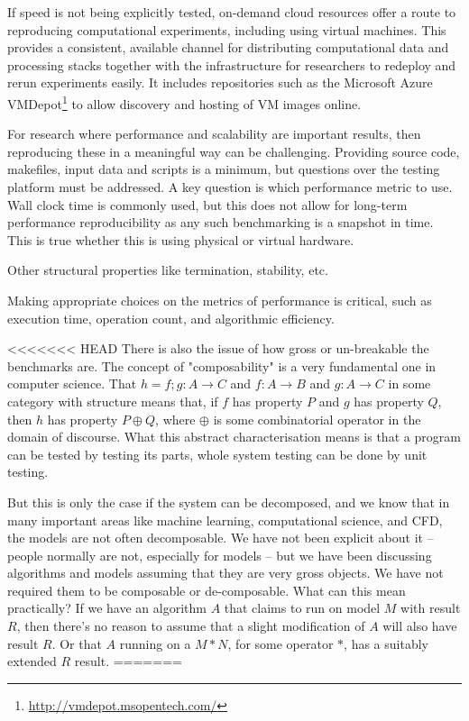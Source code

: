 \documentclass[conference]{IEEEtran}
\begin{document}
If speed is not being explicitly tested, on-demand cloud resources
offer a route to reproducing computational experiments, including
using virtual machines. This provides a consistent, available channel
for distributing computational data and processing stacks together
with the infrastructure for researchers to redeploy and rerun
experiments easily. It includes repositories such as the Microsoft
Azure VMDepot\footnote{\url{http://vmdepot.msopentech.com/}} to allow
discovery and hosting of VM images online.

For research  where performance and scalability are important results, then 
reproducing these in a meaningful way can be challenging. Providing source
code, makefiles, input data and scripts is a minimum, but questions over the
testing platform must be addressed. A key question is which performance 
metric to use. Wall clock time is commonly used, but this does not allow for 
long-term performance reproducibility as any such benchmarking is a 
snapshot in time. This is true whether this is using physical 
or virtual hardware. 


Other structural properties like termination, stability, etc. 

Making appropriate choices on the metrics of 
performance is critical, such as execution time, operation count, and 
algorithmic efficiency.





<<<<<<< HEAD
There is also the issue of how gross or un-breakable the benchmarks are. 
The concept of "composability" is a very fundamental one in computer science. 
That $h = f;g : A \rightarrow C$ and $f : A \rightarrow B$ and $g : A \rightarrow C$ 
in some category with structure means that, if $f$ has property $P$ and $g$ has
property $Q$, then $h$ has property $P \oplus Q$, where $\oplus$ is some 
combinatorial operator in the domain of discourse. What this abstract 
characterisation means is that a program can be tested by testing its parts,
whole system testing can be done by unit testing. 

But this is only the case if the system can be decomposed, and we know
that in many important areas like machine learning, computational
science, and CFD, the models are not often decomposable.  We have not
been explicit about it -- people normally are not, especially for
models -- but we have been discussing algorithms and models assuming
that they are very gross objects. We have not required them to be
composable or de-composable. What can this mean practically? If we
have an algorithm $A$ that claims to run on model $M$ with result $R$,
then there's no reason to assume that a slight modification of $A$
will also have result $R$. Or that $A$ running on a $M * N$, for some
operator $*$, has a suitably extended $R$ result.
=======
\end{document}
